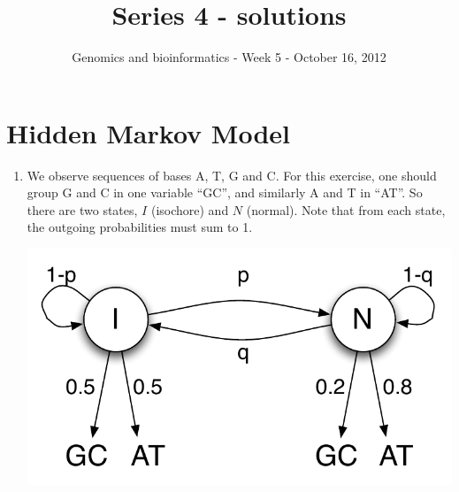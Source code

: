 \documentclass[a4paper,11pt]{article}
\title{Series 4 - solutions}
\date{}
\author{Genomics and bioinformatics - Week 5 - October 16, 2012}
\begin{document}
\maketitle

\section{Hidden Markov Model}
\begin{enumerate}
\item We observe sequences of bases A, T, G and C. For this exercise, one should group G and C in one variable ``GC'', and similarly A and T in ``AT''. So there are two states, $I$ (isochore) and $N$ (normal).  Note that from each state, the outgoing probabilities must sum to 1.

\begin{center}
\includegraphics[height=0.2\textwidth]{hmm.pdf}
\end{center}


\end{enumerate}
\end{document}
